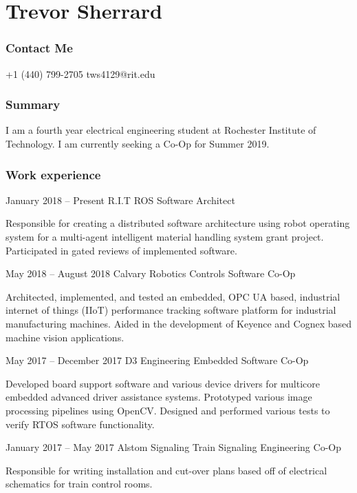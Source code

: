 \documentclass{tccv}
\begin{document}
\part{Trevor Sherrard}
\section{Contact Me}
\begin{eventlist}
    {+1 (440) 799-2705}
    {tws4129@rit.edu}
    
\end{eventlist}

\section{Summary}
I am a fourth year electrical engineering student at Rochester Institute of Technology. I am currently seeking a Co-Op for Summer 2019.

\section{Work experience}

\begin{eventlist}

\item{January 2018 -- Present}
     {R.I.T}
     {ROS Software Architect}

Responsible for creating a distributed software architecture using robot operating system for a multi-agent intelligent material handling system grant project. Participated in gated reviews of implemented software.

\item{May 2018 -- August 2018}
     {Calvary Robotics}
     {Controls Software Co-Op}

Architected, implemented, and tested an embedded, OPC UA based, industrial internet of things (IIoT) performance tracking software platform for industrial manufacturing machines. Aided in the development of Keyence and Cognex based machine vision applications.

\item{May 2017 -- December 2017}
     {D3 Engineering}
     {Embedded Software Co-Op}
     
Developed board support software and various device drivers for multicore embedded advanced driver assistance systems. Prototyped various image processing pipelines using OpenCV. Designed and performed various tests to verify RTOS software functionality.

\item{January 2017 -- May 2017}
     {Alstom Signaling}
     {Train Signaling Engineering Co-Op}

Responsible for writing installation and cut-over plans based off of electrical schematics for train control rooms.

\end{eventlist}
\end{document}
